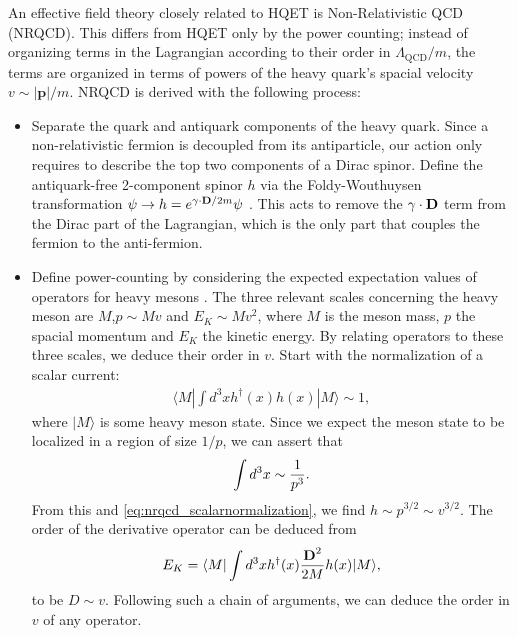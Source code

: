 An effective field theory closely related to HQET is Non-Relativistic QCD (NRQCD). This differs from HQET only by the power counting; instead of organizing terms in the Lagrangian according to their order in $\Lambda_{\text{QCD}}/m$, the terms are organized in terms of powers of the heavy quark's spacial velocity $v \sim |{\textbf{p}}|/m$. NRQCD is derived with the following process:
\begin{itemize}
\item
  Separate the quark and antiquark components of the heavy quark. Since a non-relativistic fermion is decoupled from its antiparticle, our action only requires to describe the top two components of a Dirac spinor.
  Define the antiquark-free 2-component spinor $h$ via the Foldy-Wouthuysen transformation $\psi \to h = e^{ {\bf{\gamma}}\cdot {\bf{D}}/2m} \psi$ \cite{PhysRev.78.29}. This acts to remove the ${\bf{\gamma}}\cdot {\bf{D}}$ term from the Dirac part of the Lagrangian, which is the only part that couples the fermion to the anti-fermion.
\item
  Define power-counting by considering the expected expectation values of operators for heavy mesons \cite{Lepage:1992tx}. The three relevant scales concerning the heavy meson are $M$,$p\sim Mv$ and $E_K\sim Mv^2$, where $M$ is the meson mass, $p$ the spacial momentum and $E_K$ the kinetic energy. By relating operators to these three scales, we deduce their order in $v$. Start with the normalization of a scalar current:
  \begin{align}
    \langle M | \int d^3x h^{\dagger}(x) h(x) | M \rangle \sim 1,
    \label{eq:nrqcd_scalarnormalization}
  \end{align}
  where $| M \rangle$ is some heavy meson state. Since we expect the meson state to be localized in a region of size $1/p$, we can assert that
  \begin{align}
    \int d^3x \sim {1\over p^3}.
  \end{align}
  From this and \eqref{eq:nrqcd_scalarnormalization}, we find $h \sim p^{3/2} \sim v^{3/2}$.
  The order of the derivative operator can be deduced from
  \begin{align}
    E_K = \langle M | \int d^3x h^{\dagger}(x) {{\textbf{D}}^2\over 2M} h(x) | M \rangle,
  \end{align}
  to be $D \sim v$. Following such a chain of arguments, we can deduce the order in $v$ of any operator.


\end{itemize}
